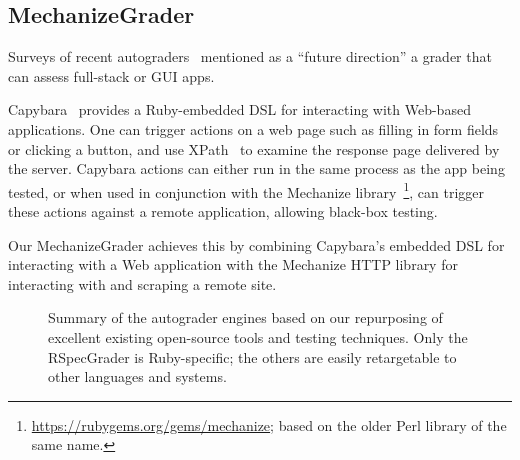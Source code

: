 \subsection{MechanizeGrader}

Surveys of recent
autograders~\cite{ihantola-2010-autograding-survey,douce-2005-autograding-survey} mentioned as
a ``future direction'' a grader that can assess full-stack or GUI apps.


Capybara~
provides a Ruby-embedded DSL for interacting with Web-based
applications.
One can trigger actions on a web page such as filling in form fields
or clicking a button, and use XPath~\cite{xpath} to examine the
response page delivered by the server.
Capybara actions can either run in the same process as the app being
tested, or when used in conjunction with the Mechanize
library~\footnote{\url{https://rubygems.org/gems/mechanize}; based on
  the older Perl library of the same name.}, can trigger these actions
against a remote application, allowing black-box testing.



Our MechanizeGrader achieves this by combining Capybara's embedded DSL
for interacting with a Web application with the Mechanize HTTP library
for interacting with and scraping a remote site.




\begin{figure}
  
  \caption{\label{fig:grader_summary} Summary of the autograder
    engines based on our repurposing of excellent existing open-source
    tools and testing techniques.  Only the RSpecGrader is
    Ruby-specific; the others are easily retargetable to other languages
    and systems.}
\end{figure}


